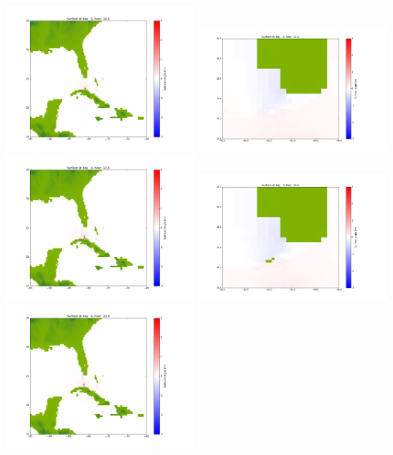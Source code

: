 \documentclass[11pt]{article}
\begin{document}
\includegraphics[width=0.475\textwidth]{frame0017fig1002.png}
\vskip 10pt 
\includegraphics[width=0.475\textwidth]{frame0018fig1001.png}
\includegraphics[width=0.475\textwidth]{frame0018fig1002.png}
\vskip 10pt 
\includegraphics[width=0.475\textwidth]{frame0019fig1001.png}
\includegraphics[width=0.475\textwidth]{frame0019fig1002.png}
\end{document}
